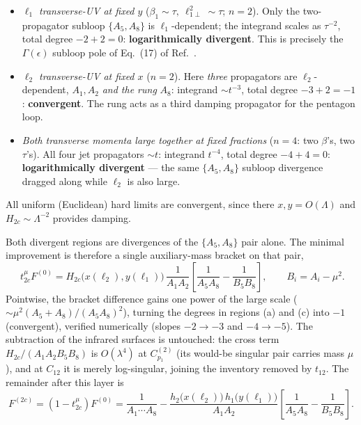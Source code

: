 \documentclass[11pt]{article}
\newcommand{\eps}{\epsilon}
\begin{document}
\begin{itemize}
\item[(a)] \emph{$\ell_1$ transverse-UV at fixed $y$} ($\beta_1\sim\tau,\ \ell_{1\perp}^2\sim\tau$;
$n=2$). Only the two-propagator subloop $\{A_5,A_8\}$ is $\ell_1$-dependent; the integrand scales
as $\tau^{-2}$, total degree $-2+2=0$: \textbf{logarithmically divergent}. This is precisely the
$\Gamma(\eps)$ subloop pole of Eq.~(17) of Ref.~\cite{kernel}.
\item[(b)] \emph{$\ell_2$ transverse-UV at fixed $x$} ($n=2$). Here \emph{three} propagators are
$\ell_2$-dependent, $A_1,A_2$ \emph{and the rung} $A_8$: integrand $\sim t^{-3}$, total degree
$-3+2=-1$: \textbf{convergent}. The rung acts as a third damping propagator for the pentagon loop.
\item[(c)] \emph{Both transverse momenta large together at fixed fractions} ($n=4$: two $\beta$'s,
two $\tau$'s). All four jet propagators $\sim t$: integrand $t^{-4}$, total degree $-4+4=0$:
\textbf{logarithmically divergent} --- the same $\{A_5,A_8\}$ subloop divergence dragged along
while $\ell_2$ is also large.
\end{itemize}
All uniform (Euclidean) hard limits are convergent, since there $x,y=O(\Lambda)$ and
$H_{2c}\sim\Lambda^{-2}$ provides damping.

Both divergent regions are divergences of the $\{A_5,A_8\}$ pair alone. The minimal improvement is
therefore a single auxiliary-mass bracket on that pair,
\begin{equation}
\boxed{\;
t^{\mu}_{2c}F^{(0)}
=H_{2c}\big(x(\ell_2),y(\ell_1)\big)\,\frac{1}{A_1A_2}
\left[\frac{1}{A_5A_8}-\frac{1}{B_5B_8}\right],
\qquad B_i=A_i-\mu^2 .}
\label{eq:t2cmu}
\end{equation}
Pointwise, the bracket difference gains one power of the large scale
($\sim\mu^2(A_5+A_8)/(A_5A_8)^2$), turning the degrees in regions (a) and (c) into $-1$
(convergent), verified numerically (slopes $-2\to-3$ and $-4\to-5$). The subtraction of the
infrared surfaces is untouched: the cross term $H_{2c}/(A_1A_2B_5B_8)$ is $O(\lambda^4)$ at
$C^{(2)}_{p_1}$ (its would-be singular pair carries mass $\mu$), and at $C_{12}$ it is merely
log-singular, joining the inventory removed by $t_{12}$. The remainder after this layer is
\begin{equation}
F^{(2c)}=(1-t^\mu_{2c})F^{(0)}
=\frac{1}{A_1\cdots A_8}
-\frac{h_2\big(x(\ell_2)\big)\,h_1\big(y(\ell_1)\big)}{A_1A_2}
\left[\frac{1}{A_5A_8}-\frac{1}{B_5B_8}\right].
\label{eq:F2c}
\end{equation}
\end{document}
